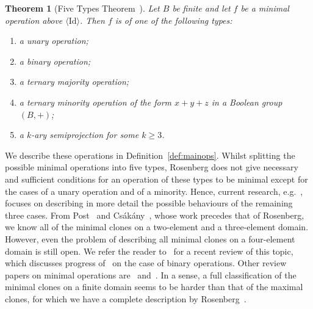 \documentclass{article}
\newtheorem{theorem}{Theorem}[section]
\theoremstyle{remark}
\theoremstyle{definition}
\begin{document}
\begin{theorem}[Five Types Theorem~\cite{fivetypes}]\label{thm:firstheorem} Let $B$ be finite and let $f$ be a minimal operation above $\langle \mathrm{Id} \rangle$. Then $f$ is of one of the following types:
\begin{enumerate}
    \item a unary operation;
    \item a binary operation;
    \item a ternary majority operation;
    \item a ternary minority operation of the form $x+y+z$ in a Boolean group $(B,+)$;
    \item a $k$-ary semiprojection for some $k\geq 3$.
\end{enumerate}
\end{theorem}
We describe these operations in Definition~\ref{def:mainops}. Whilst splitting the possible minimal operations into five types, Rosenberg does not give necessary and sufficient conditions for an operation of these types to be minimal except for the cases of a unary operation and of a minority. Hence, current research, e.g.~\cite{brady2023coarse, machida2024orderly}, focuses on describing in more detail the possible behaviours of the remaining three cases. From Post~\cite{postlattice} and Cs\'{a}k\'{a}ny~\cite{csakany1983all}, whose work precedes that of Rosenberg, we know all of the minimal clones on a two-element and a three-element domain. However, even the problem of describing all minimal clones on a four-element domain is still open. We refer the reader to~\cite{szendrei2024ivo} for a recent review of this topic, which discusses progress of~\cite{brady2023coarse} on the case of binary operations. Other review papers on minimal operations are~\cite{quackenbush1995survey} and~\cite{csakany2005minimal}. In a sense, a full classification of the minimal clones on a finite domain seems to be harder than that of the maximal clones, for which we have a complete description by Rosenberg~\cite{rosenberg1965structure, rosenberg1970uber}.\\
\end{document}

